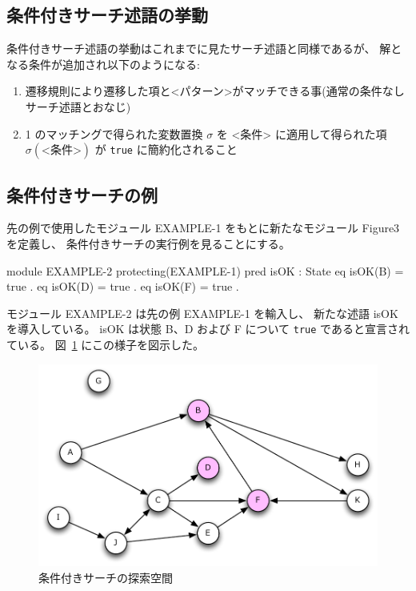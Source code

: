 \documentclass{article}
\begin{document}
\subsection{条件付きサーチ述語の挙動}
条件付きサーチ述語の挙動はこれまでに見たサーチ述語と同様であるが、
解となる条件が追加され以下のようになる:
\begin{enumerate}
\item 遷移規則により遷移した項と<パターン>がマッチできる事(通常の条件なしサーチ述語とおなじ)
\item 1 のマッチングで得られた変数置換 $\sigma$ を <条件> に適用して得られた項 $\sigma(\mbox{<条件>})$ が \texttt{true} に簡約化されること
\end{enumerate}

\subsection{条件付きサーチの例}
先の例で使用したモジュール EXAMPLE-1 をもとに新たなモジュール Figure3 を定義し、
条件付きサーチの実行例を見ることにする。
\begin{simplev}
module EXAMPLE-2 {
  protecting(EXAMPLE-1)
  pred isOK : State 
  eq isOK(B) = true .
  eq isOK(D) = true .
  eq isOK(F) = true .
}
\end{simplev}
モジュール EXAMPLE-2 は先の例 EXAMPLE-1 を輸入し、
新たな述語 isOK を導入している。
isOK は状態 B、D および F について \texttt{true} であると宣言されている。
図~\ref{fig:figure3} にこの様子を図示した。
\begin{figure}[htbp]
  \begin{center}
    \includegraphics[scale=0.6]{figure3.pdf}
    \caption{条件付きサーチの探索空間}
    \label{fig:figure3}
  \end{center}
\end{figure}
\end{document}
